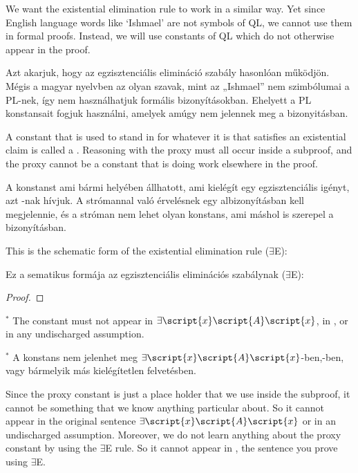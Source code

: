 We want the existential elimination rule to work in a similar way. Yet since English language words like `Ishmael' are not symbols of QL, we cannot use them in formal proofs. Instead, we will use constants of QL which do not otherwise appear in the proof.

Azt akarjuk, hogy az egzisztenciális elimináció szabály hasonlóan működjön. Mégis a magyar nyelvben az olyan szavak, mint az „Ishmael” nem szimbólumai a PL-nek, így nem használhatjuk formális bizonyításokban. Ehelyett a PL konstansait fogjuk használni, amelyek amúgy nem jelennek meg a bizonyitásban.

A constant that is used to stand in for whatever it is that satisfies an existential claim is called a . Reasoning with the proxy must all occur inside a subproof, and the proxy cannot be a constant that is doing work elsewhere in the proof.

A konstanst ami bármi helyében állhatott, ami kielégít egy egzisztenciális igényt, azt -nak hívjuk. A strómannal való érvelésnek egy albizonyításban kell megjelennie, és a stróman nem lehet olyan konstans, ami máshol is szerepel a bizonyításban.

This is the schematic form of the existential elimination rule ($\exists$E): 

Ez a sematikus formája az egzisztenciális eliminációs szabálynak ($\exists$E):

\begin{proof}
	\open	
	\close
	 
\end{proof}
$^\ast$ The constant  must not appear in $\exists\script{x}\script{A}\script{x}$, in , or in any undischarged assumption.

$^\ast$ A  konstans nem jelenhet meg $\exists\script{x}\script{A}\script{x}$-ben,-ben, vagy bármelyik más kielégítetlen felvetésben.


Since the proxy constant is just a place holder that we use inside the subproof, it cannot be something that we know anything particular about. So it cannot appear in the original sentence $\exists\script{x}\script{A}\script{x}$ or in an undischarged assumption. Moreover, we do not learn anything about the proxy constant by using the $\exists$E rule. So it cannot appear in , the sentence you prove using $\exists$E.

